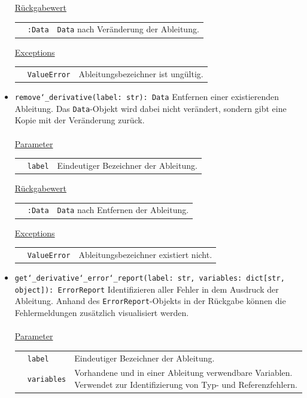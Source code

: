 \documentclass{article}
\begin{document}
\begin{itemize}
\underline{{Rückgabewert}}

\begin{tabular}{lll}
 & \texttt{:Data} & \texttt{Data} nach Veränderung der Ableitung. \\
\end{tabular}

\underline{Exceptions}\\
\begin{tabular}{lll}
 & \texttt{ValueError} & Ableitungsbezeichner ist ungültig.\\
\end{tabular}


\item \texttt{remove\char`_derivative(label: str): Data} \newline Entfernen einer existierenden Ableitung. Das \texttt{Data}-Objekt wird dabei nicht verändert, sondern gibt eine Kopie mit der Veränderung zurück.
\\\\
\underline{{Parameter}}

\begin{tabular}{lll}
 & \texttt{label} & Eindeutiger Bezeichner der Ableitung. \\
\end{tabular}

\underline{{Rückgabewert}}

\begin{tabular}{lll}
 & \texttt{:Data} & \texttt{Data} nach Entfernen der Ableitung. \\
\end{tabular}

\underline{Exceptions}\\
\begin{tabular}{lll}
 & \texttt{ValueError} & Ableitungsbezeichner existiert nicht.\\
\end{tabular}

\item \texttt{get\char`_derivative\char`_error\char`_report(label: str, variables: dict[str, object]): ErrorReport} \newline Identifizieren aller Fehler in dem Ausdruck der Ableitung. Anhand des \texttt{ErrorReport}-Objekts in der Rückgabe können die Fehlermeldungen zusätzlich visualisiert werden.
\\\\
\underline{{Parameter}}

\begin{tabular}{lll}
 & \texttt{label} & Eindeutiger Bezeichner der Ableitung. \\
 & \texttt{variables} & Vorhandene und in einer Ableitung verwendbare Variablen. Verwendet zur Identifizierung von Typ- und Referenzfehlern. \\
\end{tabular}


\end{itemize}
\end{document}
